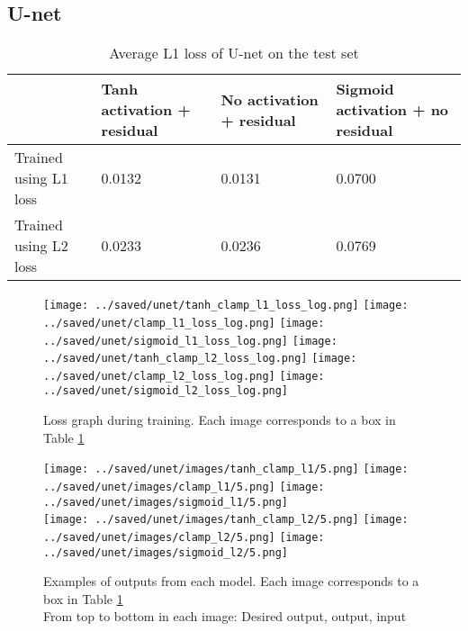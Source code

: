 \subsection{U-net}
\begin{table}[H]
  \begin{tabular}{|l|l|l|l|}
    \hline
    & Tanh activation + residual & No activation + residual & Sigmoid activation + no residual \\ \hline
    Trained using L1 loss & 0.0132 & 0.0131 & 0.0700 \\ \hline
    Trained using L2 loss & 0.0233 & 0.0236 & 0.0769 \\ \hline
  \end{tabular}
  \caption{Average L1 loss of U-net on the test set}\label{fig:unet_perf}
\end{table}

\begin{figure}[H]
  \centering
  \captionsetup{justification=centering}
  \texttt{[image: ../saved/unet/tanh\_clamp\_l1\_loss\_log.png]}
  \texttt{[image: ../saved/unet/clamp\_l1\_loss\_log.png]}
  \texttt{[image: ../saved/unet/sigmoid\_l1\_loss\_log.png]}
  \texttt{[image: ../saved/unet/tanh\_clamp\_l2\_loss\_log.png]}
  \texttt{[image: ../saved/unet/clamp\_l2\_loss\_log.png]}
  \texttt{[image: ../saved/unet/sigmoid\_l2\_loss\_log.png]}
  \caption[center]{Loss graph during training. Each image corresponds to a box in Table \ref{fig:unet_perf}}\label{image:unet_loss}
\end{figure}

\begin{figure}[H]
  \centering
  \captionsetup{justification=centering}
  \texttt{[image: ../saved/unet/images/tanh\_clamp\_l1/5.png]}
  \texttt{[image: ../saved/unet/images/clamp\_l1/5.png]}
  \texttt{[image: ../saved/unet/images/sigmoid\_l1/5.png]}\\
  \texttt{[image: ../saved/unet/images/tanh\_clamp\_l2/5.png]}
  \texttt{[image: ../saved/unet/images/clamp\_l2/5.png]}
  \texttt{[image: ../saved/unet/images/sigmoid\_l2/5.png]}
  \caption[center]{Examples of outputs from each model. Each image corresponds to a box in Table \ref{fig:unet_perf}\\ From top to bottom in each image: Desired output, output, input}\label{image:unet_images}
\end{figure}


